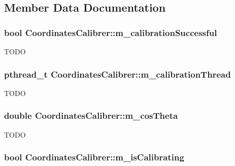 \subsection{Member Data Documentation}
\hypertarget{classCoordinatesCalibrer_aade3d6c933ebb71c197061828ca6b951}{
\subsubsection[{m\_\-calibrationSuccessful}]{\setlength{\rightskip}{0pt plus 5cm}bool {\bf CoordinatesCalibrer::m\_\-calibrationSuccessful}}}
\label{classCoordinatesCalibrer_aade3d6c933ebb71c197061828ca6b951}
TODO \hypertarget{classCoordinatesCalibrer_aa2b792c4284dc94338c9acbd26ea2c3a}{
\subsubsection[{m\_\-calibrationThread}]{\setlength{\rightskip}{0pt plus 5cm}pthread\_\-t {\bf CoordinatesCalibrer::m\_\-calibrationThread}}}
\label{classCoordinatesCalibrer_aa2b792c4284dc94338c9acbd26ea2c3a}
TODO \hypertarget{classCoordinatesCalibrer_a0fd71c87e90fc61802942e22c9584fb9}{
\subsubsection[{m\_\-cosTheta}]{\setlength{\rightskip}{0pt plus 5cm}double {\bf CoordinatesCalibrer::m\_\-cosTheta}}}
\label{classCoordinatesCalibrer_a0fd71c87e90fc61802942e22c9584fb9}
TODO \hypertarget{classCoordinatesCalibrer_a2d3543afab02c87d0e06861d064bd265}{
\subsubsection[{m\_\-isCalibrating}]{\setlength{\rightskip}{0pt plus 5cm}bool {\bf CoordinatesCalibrer::m\_\-isCalibrating}}}
